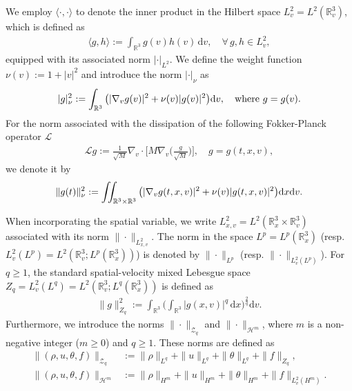 \documentclass[reqno,11pt]{amsart}
\theoremstyle{plain}
\numberwithin{equation}{section}
\begin{document}
We employ $\langle\cdot,\cdot\rangle$ to denote the inner product in 
the Hilbert space $L^2_v=L^2(\mathbb{R}^3_v)$, which is defined as  
\begin{align*}  
\langle g,h\rangle := \int_{\mathbb{R}^3} g(v) h(v) \, \mathrm{d}v, \quad \forall \, g,h \in L^2_v,  
\end{align*}  
equipped with its associated norm $ |\cdot |_{L^2}$.
We define the weight function $\nu(v):=1+|v|^2$ and introduce the norm $|\cdot|_{\nu}$ as 
\begin{align*}  
|g|_{\nu}^{2} := \int_{\mathbb{R}^3} \big(|\nabla_v g(v)|^2 
+ \nu(v) |g(v)|^2\big) {\rm d}v, \quad \text{where } g = g(v).  
\end{align*}  
For the norm associated with the dissipation of the following Fokker-Planck 
operator $\mathcal{L}$ 
\begin{align} \label{lglga}
\mathcal{L}g := \frac{1}{\sqrt{M}} \nabla_v \cdot \Big[ M \nabla_v \Big( \frac{g}{\sqrt{M}} \Big) \Big], 
\quad g=g(t,x,v) ,
\end{align}  
we denote it by  
\begin{align*}  
\|g(t)\|_{\nu}^{2} := \iint_{\mathbb{R}^3 \times \mathbb{R}^3} 
\big(|\nabla_v g(t,x,v)|^2 + \nu(v) |g(t,x,v)|^2\big) {\rm d}x {\rm d}v.  
\end{align*}

When incorporating the spatial variable, we write $L^2_{x,v} = L^2(\mathbb{R}^3_x 
\times \mathbb{R}^3_v)$ associated with its norm $\|\cdot\|_{L^2_{x,v}}$. 
The norm in the space $L^p = L^p(\mathbb{R}^3_x)$ (resp. $L^2_v(L^p )
 = L^2(\mathbb{R}^3_v; L^p(\mathbb{R}^3_x))$) is denoted by $\|\cdot\|_{L^p}$ 
 (resp. $\|\cdot\|_{L^2_v(L^p )}$). For $q \geq 1$, the standard spatial-velocity mixed
 Lebesgue space $ {Z}_q = L_v^2(L ^q) = L^2(\mathbb{R}_v^3; L^q(\mathbb{R}_x^3))$ is defined as  
\begin{align*}  
\|g\|_{Z_q}^2 := \int_{\mathbb{R}^3} \Big( \int_{\mathbb{R}^3} |g(x,v)|^q \, \mathrm{d}x \Big)^{\frac{2}{q}} \mathrm{d}v.  
\end{align*}
Furthermore, we introduce the norms $\|\cdot\|_{\mathcal{Z}_{q}}$ and $\|\cdot\|_{\mathcal{H}^{m}}$, where $m$ is a non-negative integer ($m \geq 0$) and $q \geq 1$. These norms are defined as  
\begin{align*}  
\|(\rho, u,\theta,f)\|_{\mathcal{Z}_{q}} & := 
 \|\rho\|_{L^{q}} + \|u\|_{L^{q}}+\|\theta\|_{L^q}+\|f\|_{ {Z}_{q}} , \\  
\|( \rho, u,\theta,f)\|_{\mathcal{H}^{m}} & :=  \|\rho\|_{H^{m}} + \|u\|_{H^{m}}+\|\theta\|_{H^m}+\|f\|_{L^{2}_{v}(H^m)}.  
\end{align*}  
\end{document}
